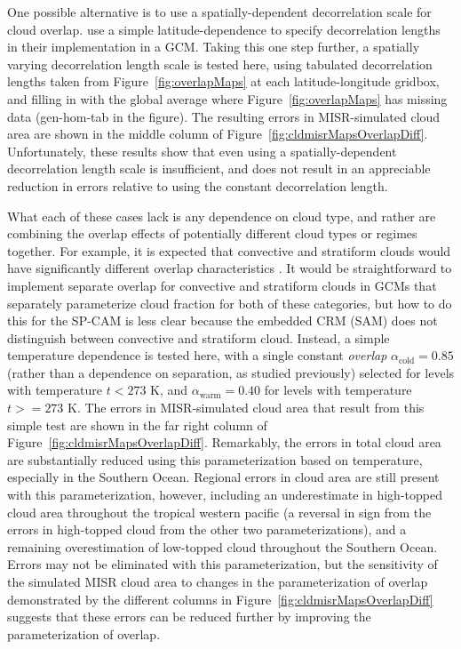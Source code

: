 One possible alternative is to use a spatially-dependent decorrelation
scale for cloud overlap. \citep{oreopoulos_et_al_2012} use a simple
latitude-dependence to specify decorrelation lengths in their
implementation in a GCM. Taking this one step further, a spatially
varying decorrelation length scale is tested here, using tabulated
decorrelation lengths taken from Figure~\ref{fig:overlapMaps} at each
latitude-longitude gridbox, and filling in with the global average where
Figure~\ref{fig:overlapMaps} has missing data (gen-hom-tab in the
figure). The resulting errors in MISR-simulated cloud area are shown in
the middle column of Figure~\ref{fig:cldmisrMapsOverlapDiff}.
Unfortunately, these results show that even using a spatially-dependent
decorrelation length scale is insufficient, and does not result in an
appreciable reduction in errors relative to using the constant
decorrelation length.

What each of these cases lack is any dependence on cloud type, and
rather are combining the overlap effects of potentially different cloud
types or regimes together. For example, it is expected that convective
and stratiform clouds would have significantly different overlap
characteristics \citep[e.g.,][]{pincus_et_al_2005}. It would be
straightforward to implement separate overlap for convective and
stratiform clouds in GCMs that separately parameterize cloud fraction
for both of these categories, but how to do this for the SP-CAM is less
clear because the embedded CRM (SAM) does not distinguish between
convective and stratiform cloud. Instead, a simple temperature
dependence is tested here, with a single constant \emph{overlap}
\(\alpha_\textrm{cold} = 0.85\) (rather than a dependence on separation,
as studied previously) selected for levels with temperature \(t < 273\)
K, and \(\alpha_\textrm{warm} = 0.40\) for levels with temperature
\(t >= 273\) K. The errors in MISR-simulated cloud area that result from
this simple test are shown in the far right column of
Figure~\ref{fig:cldmisrMapsOverlapDiff}. Remarkably, the errors in total
cloud area are substantially reduced using this parameterization based
on temperature, especially in the Southern Ocean. Regional errors in
cloud area are still present with this parameterization, however,
including an underestimate in high-topped cloud area throughout the
tropical western pacific (a reversal in sign from the errors in
high-topped cloud from the other two parameterizations), and a remaining
overestimation of low-topped cloud throughout the Southern Ocean. Errors
may not be eliminated with this parameterization, but the sensitivity of
the simulated MISR cloud area to changes in the parameterization of
overlap demonstrated by the different columns in
Figure~\ref{fig:cldmisrMapsOverlapDiff} suggests that these errors can
be reduced further by improving the parameterization of overlap.

